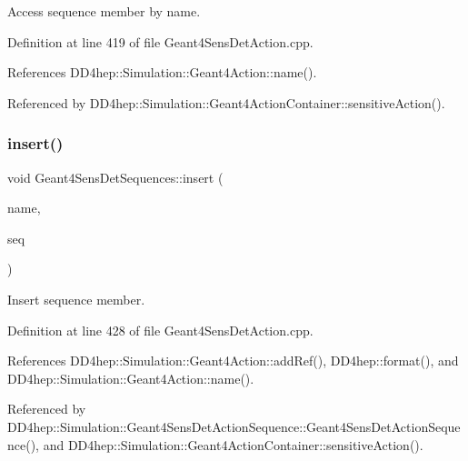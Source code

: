 Access sequence member by name. 



Definition at line 419 of file Geant4\+Sens\+Det\+Action.\+cpp.



References D\+D4hep\+::\+Simulation\+::\+Geant4\+Action\+::name().



Referenced by D\+D4hep\+::\+Simulation\+::\+Geant4\+Action\+Container\+::sensitive\+Action().

\hypertarget{class_d_d4hep_1_1_simulation_1_1_geant4_sens_det_sequences_a94c88487954aa5877af76b61d5f5ed20}{}\label{class_d_d4hep_1_1_simulation_1_1_geant4_sens_det_sequences_a94c88487954aa5877af76b61d5f5ed20} 
\subsubsection{\texorpdfstring{insert()}{insert()}}
{\footnotesize\ttfamily void Geant4\+Sens\+Det\+Sequences\+::insert (\begin{DoxyParamCaption}\item[{const std\+::string \&}]{name,  }\item[{\hyperlink{class_d_d4hep_1_1_simulation_1_1_geant4_sens_det_action_sequence}{Geant4\+Sens\+Det\+Action\+Sequence} $\ast$}]{seq }\end{DoxyParamCaption})\hspace{0.3cm}{\ttfamily [private]}}



Insert sequence member. 



Definition at line 428 of file Geant4\+Sens\+Det\+Action.\+cpp.



References D\+D4hep\+::\+Simulation\+::\+Geant4\+Action\+::add\+Ref(), D\+D4hep\+::format(), and D\+D4hep\+::\+Simulation\+::\+Geant4\+Action\+::name().



Referenced by D\+D4hep\+::\+Simulation\+::\+Geant4\+Sens\+Det\+Action\+Sequence\+::\+Geant4\+Sens\+Det\+Action\+Sequence(), and D\+D4hep\+::\+Simulation\+::\+Geant4\+Action\+Container\+::sensitive\+Action().

